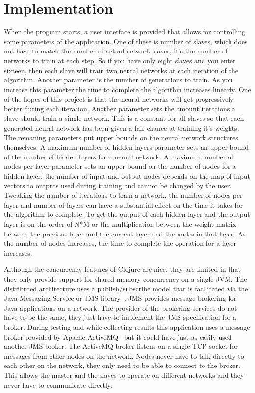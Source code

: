 \section{Implementation}
When the program starts, a user interface is provided that allows for controlling some parameters of the application. One of these is number of slaves, which does not have to match the number of actual network slaves, it's the number of networks to train at each step. So if you have only eight slaves and you enter sixteen, then each slave will train two neural networks at each iteration of the algorithm. Another parameter is the number of generations to train. As you increase this parameter the time to complete the algorithm increases linearly. One of the hopes of this project is that the neural networks will get progressively better during each iteration. Another parameter sets the amount iterations a slave should train a single network. This is a constant for all slaves so that each generated neural network has been given a fair chance at training it's weights. The remaning parameters put upper bounds on the neural network structures themselves. A maximum number of hidden layers parameter sets an upper bound of the number of hidden layers for a neural network. A maximum number of nodes per layer parameter sets an upper bound on the number of nodes for a hidden layer, the number of input and output nodes depends on the map of input vectors to outputs used during training and cannot be changed by the user. Tweaking the number of iterations to train a network, the number of nodes per layer and number of layers can have a substantial effect on the time it takes for the algorithm to complete. To get the output of each hidden layer and the output layer is on the order of N*M or the multiplication between the weight matrix between the previous layer and the current layer and the nodes in that layer. As the number of nodes increases, the time to complete the operation for a layer increases.

Although the concurrency features of Clojure are nice, they are limited in that they only provide support for shared memory concurrency on a single JVM. The distributed architecture uses a publish/subscribe model that is facilitated via the Java Messaging Service or JMS library~\cite{jms}. JMS provides message brokering for Java applications on a network. The provider of the brokering services do not have to be the same, they just have to implement the JMS specification for a broker. During testing and while collecting results this application uses a message broker provided by Apache ActiveMQ~\cite{activeMQ} but it could have just as easily used another JMS broker. The ActiveMQ broker listens on a single TCP socket for messages from other nodes on the network. Nodes never have to talk directly to each other on the network, they only need to be able to connect to the broker. This allows the master and the slaves to operate on different networks and they never have to communicate directly.

